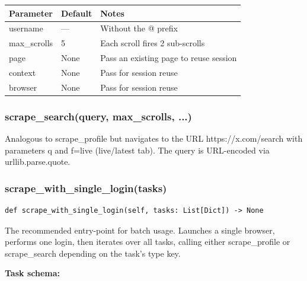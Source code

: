 \documentclass[11pt, a4paper]{article}
\def\method#1{#1}%
\def\param#1{#1}%
\def\texttt#1{#1}%
\def\color#1{}%
\newcommand{\method}[1]{\texttt{\color{TwBlue}#1}}
\newcommand{\param}[1]{\texttt{\color{TwGreen!70!black}#1}}
\begin{document}
\begin{center}
\begin{tabular}{lll}
\toprule
\textbf{Parameter}    & \textbf{Default} & \textbf{Notes} \\
\midrule
\param{username}      & ---         & Without the \texttt{@} prefix \\
\param{max\_scrolls}  & \texttt{5} & Each scroll fires 2 sub-scrolls \\
\param{page}          & \texttt{None} & Pass an existing page to reuse session \\
\param{context}       & \texttt{None} & Pass for session reuse \\
\param{browser}       & \texttt{None} & Pass for session reuse \\
\bottomrule
\end{tabular}
\end{center}

\subsubsection{\texorpdfstring{\method{scrape\_search(query, max\_scrolls, ...)}}{}}

Analogous to \method{scrape\_profile} but navigates to the URL
\texttt{https://x.com/search} with parameters \texttt{q} and
\texttt{f=live} (live/latest tab). The query is URL-encoded via
\texttt{urllib.parse.quote}.

\subsubsection{\texorpdfstring{\method{scrape\_with\_single\_login(tasks)}}{}}

\begin{tcolorbox}[pybox, title={\texttt{scrape\_with\_single\_login}}]
\begin{lstlisting}[style=pycode]
def scrape_with_single_login(self, tasks: List[Dict]) -> None
\end{lstlisting}
\end{tcolorbox}

The recommended entry-point for batch usage. Launches a single browser,
performs one login, then iterates over all tasks, calling either
\method{scrape\_profile} or \method{scrape\_search} depending on the
task's \texttt{type} key.

\textbf{Task schema:}
\end{document}
